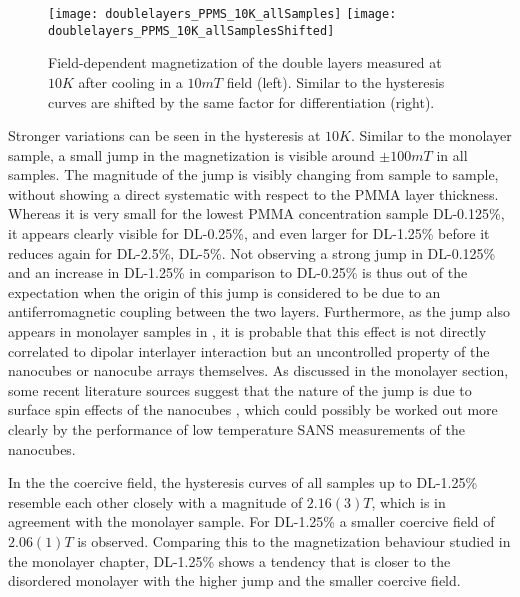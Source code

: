 \documentclass[\main/dresen_thesis.tex]{subfiles}
\begin{document}

    \begin{figure}[tb]
      \centering
      \texttt{[image: doublelayers\_PPMS\_10K\_allSamples]}
      \texttt{[image: doublelayers\_PPMS\_10K\_allSamplesShifted]}
      \caption{\label{fig:doubleLayers:10KVSM}Field-dependent magnetization of the double layers measured at $10 \unit{K}$ after cooling in a $10 \unit{mT}$ field (left). Similar to  the hysteresis curves are shifted by the same factor for differentiation (right).}
    \end{figure}
    Stronger variations can be seen in the hysteresis at $10 \unit{K}$.
    Similar to the monolayer sample, a small jump in the magnetization is visible around $\pm 100 \unit{mT}$ in all samples.
    The magnitude of the jump is visibly changing from sample to sample, without showing a direct systematic with respect to the PMMA layer thickness.
    Whereas it is very small for the lowest PMMA concentration sample DL-0.125\%, it appears clearly visible for DL-0.25\%, and even larger for DL-1.25\% before it reduces again for DL-2.5\%, DL-5\%.
    Not observing a strong jump in DL-0.125\% and an increase in DL-1.25\% in comparison to DL-0.25\% is thus out of the expectation when the origin of this jump is considered to be due to an antiferromagnetic coupling between the two layers.
    Furthermore, as the jump also appears in monolayer samples in , it is probable that this effect is not directly correlated to dipolar interlayer interaction but an uncontrolled property of the nanocubes or nanocube arrays themselves.
    As discussed in the monolayer section, some recent literature sources suggest that the nature of the jump is due to surface spin effects of the nanocubes \cite{Xu_2015_Simul, Fu_2012_Uniqu}, which could possibly be worked out more clearly by the performance of low temperature SANS measurements of the nanocubes.

    In the the coercive field, the hysteresis curves of all samples up to DL-1.25\% resemble each other closely with a  magnitude of $2.16(3) \unit{T}$, which is in agreement with the monolayer sample.
    For DL-1.25\% a smaller coercive field of $2.06(1) \unit{T}$ is observed.
    Comparing this to the magnetization behaviour studied in the monolayer chapter, DL-1.25\% shows a tendency that is closer to the disordered monolayer with the higher jump and the smaller coercive field.
  \\
\end{document}
